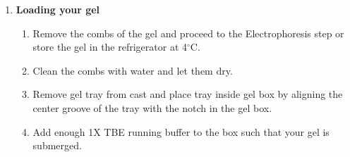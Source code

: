\documentclass[11pt, oneside]{article}
\begin{document}
\begin{enumerate}
\begin{enumerate}
				\begin{adjustwidth}{0.75in}{0pt}	(Ci) (Mi) = (Cf) (Mf) 

				Where C = concentration, M = mass, i = initial, f = final  

				The formula would look as follow for a 2\% gel in a 35ml tray 

				(100\%) (Mi) = (2\%) (35g) 
				
				Mi  =  0.7 g agarose powder \end{adjustwidth}

				 once you calculate the amount of agarose needed, you can post it in a shared environment so you skip doing the 				calculation again in the future for a similar set up.

				\item Add 1X TBE or another buffer of choice (not previously used) in a 250ml Erlenmeyer Flask labeled for gel work. Swirl the flask a 				few times. 
				\item Microwave the gel until no agarose particles are visible ($\sim$1:15). Note: The agarose is melted when the solution is completely 				clear.
				\item Let the gel cool to lukewarm temperature (3-4 minutes). 
				\item Add 0.1\% of the final agarose volume worth of EtBr to the boiled gel. For example, add 0.35 uL of EtBr check on EtBr of the lab 				and add it here to the 35 mL agarose made in the example of step number 3. 
				\item Pour the gel into the gel casting tray. 
				\item Immediately scrub and rinse your flask with warm H20.
				\item Leave your gel to set for 20-30 min.
			\end{enumerate}
			\item{\bf Loading your gel}
				\begin{enumerate}
					\item Remove the combs of the gel and proceed to the Electrophoresis step or store the gel in the refrigerator at 4$^{\circ}$C. 
					\item Clean the combs with water and let them dry. 
					\item Remove gel tray from cast and place tray inside gel box by aligning the center groove of the tray with the notch in the gel box.
					\item Add enough 1X TBE running buffer to the box such that your gel is submerged.

\end{enumerate}
\end{enumerate}
\end{document}
